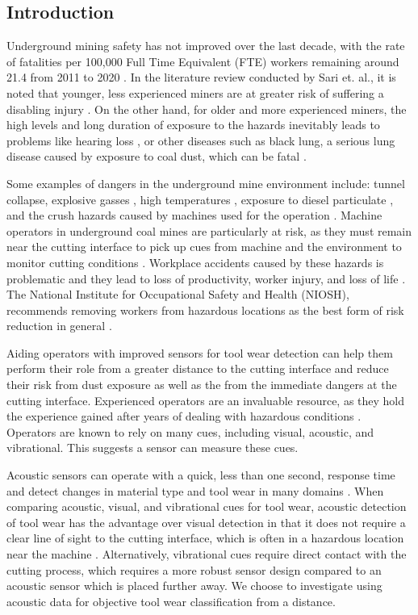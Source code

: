 \subsection{Introduction}\label{sec1}

Underground mining safety has not improved over the last decade, with the rate of fatalities
per 100,000 Full Time Equivalent (FTE) workers remaining around 21.4 from 2011 to 2020 \cite{nioshdata}. 
In the literature review conducted by Sari et. al., it is noted that younger, less experienced
miners are at greater risk of suffering a disabling injury \cite{Sari2004}.
On the other hand, for older and more experienced miners, 
the high levels and long duration of exposure to the hazards inevitably leads to problems
like hearing loss \cite{Erol2022}, or other diseases such as black lung, 
a serious lung disease caused by exposure to coal dust, which can be fatal \cite{Colinent2020}.

Some examples of dangers in the underground mine environment include: 
tunnel collapse, explosive gasses \cite{Juganda2022},
high temperatures \cite{cinar2020}, exposure to diesel particulate \cite{Bugarski2022},
and the crush hazards caused by machines used for the operation \cite{Swanson2019}.
Machine operators in underground coal mines are particularly at risk,
as they must remain near the cutting interface to pick up cues from machine and the environment
to monitor cutting conditions \cite{Bartels2009}.
Workplace accidents caused by these hazards is problematic and they lead to 
loss of productivity, worker injury, and loss of life \cite{sensogut2021}.
The National Institute for Occupational Safety and Health (NIOSH), 
recommends removing workers from hazardous locations as the best form
of risk reduction in general \cite{niosh_2015}.

Aiding operators with improved sensors for tool wear detection can help them 
perform their role from a greater distance to the cutting interface and 
reduce their risk from dust exposure as well as the from the immediate dangers at the cutting interface.
Experienced operators are an invaluable resource, 
 as they hold the experience gained after years of dealing with hazardous conditions \cite{Bartels2009}.
Operators are known to rely on many cues, including visual, acoustic, and vibrational.
This suggests a sensor can measure these cues.

Acoustic sensors can operate with a quick, less than one second, response time and detect changes in 
material type and tool wear in many domains \cite{Zakeri2017, Zhong2013, Rad2014, Zakeri2015}.
When comparing acoustic, visual, and vibrational cues for tool wear,
acoustic detection of tool wear has the advantage over visual detection in that it
does not require a clear line of sight to the cutting interface, 
which is often in a hazardous location near the machine \cite{Bartels2009}.
Alternatively, vibrational cues require direct contact with the cutting process, 
which requires a more robust sensor design compared to an acoustic sensor which is placed further away.
We choose to investigate using acoustic data for objective tool wear classification from a distance.

